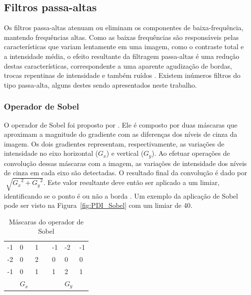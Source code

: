 \documentclass[12pt,oneside,a4paper,english,french,spanish,brazil,]{abntex2}
\begin{document}
\subsection{Filtros passa-altas}

Os filtros passa-altas atenuam ou eliminam os componentes de baixa-frequência, mantendo frequências altas. Como as baixas frequências são responsáveis pelas características que variam lentamente em uma imagem, como o contraste total e a intensidade média, o efeito resultante da filtragem passa-altas é uma redução destas características, correspondente a uma aparente agudização de bordas, trocas repentinas de intensidade e também ruídos \cite{gonzalez:2012}. Existem inúmeros filtros do tipo passa-alta, alguns destes sendo apresentados neste trabalho.

\subsubsection{Operador de Sobel}

O operador de Sobel foi proposto por \citet{sobel:1968}. Ele é composto por duas máscaras que aproximam a magnitude do gradiente com as diferenças dos níveis de cinza da imagem. Os dois gradientes representam, respectivamente, as variações de intensidade no eixo horizontal (\(G_x\)) e vertical (\(G_y\)). Ao efetuar operações de convolução dessas máscaras com a imagem, as variações de intensidade dos níveis de cinza em cada eixo são detectadas. O resultado final da convolução é dado por \(\sqrt[]{{G_x}^2 + {G_y}^2}\). Este valor resultante deve então ser aplicado a um limiar, identificando se o ponto é ou não a borda \cite{pedrini:2008}. Um exemplo da aplicação de Sobel pode ser visto na Figura~\ref{fig:PDI_Sobel} com um limiar de 40.

\begin{table}
\centering
\caption{Máscaras do operador de Sobel}
\label{tab:Sobel}
\begin{tabular}{lllllll}
\cline{1-3} \cline{5-7}
\multicolumn{1}{|l|}{-1} & \multicolumn{1}{l|}{0} & \multicolumn{1}{l|}{1} & \multicolumn{1}{l|}{} & \multicolumn{1}{l|}{-1} & \multicolumn{1}{l|}{-2} & \multicolumn{1}{l|}{-1} \\ \cline{1-3} \cline{5-7} 
\multicolumn{1}{|l|}{-2} & \multicolumn{1}{l|}{0} & \multicolumn{1}{l|}{2} & \multicolumn{1}{l|}{} & \multicolumn{1}{l|}{0}  & \multicolumn{1}{l|}{0}  & \multicolumn{1}{l|}{0}  \\ \cline{1-3} \cline{5-7} 
\multicolumn{1}{|l|}{-1} & \multicolumn{1}{l|}{0} & \multicolumn{1}{l|}{1} & \multicolumn{1}{l|}{} & \multicolumn{1}{l|}{1}  & \multicolumn{1}{l|}{2}  & \multicolumn{1}{l|}{1}  \\ \cline{1-3} \cline{5-7} 
                         & \(G_x\)                   &                        &                       &                         & \(G_y\)                    &                        
\end{tabular}
\end{table}
\end{document}
